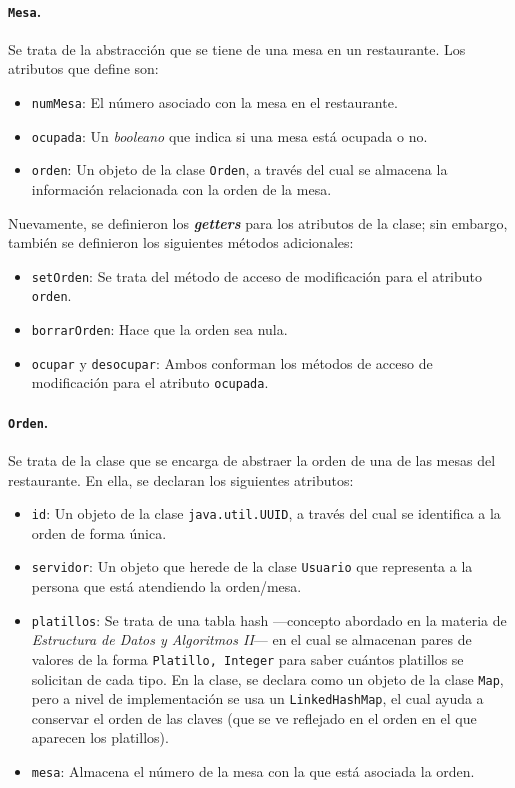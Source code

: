 \paragraph{\texttt{Mesa}.} Se trata de la abstracción que se tiene de una mesa en 
un restaurante. Los atributos que define son:
\begin{itemize}
  \item \texttt{numMesa}: El número asociado con la mesa en el restaurante.
  \item  \texttt{ocupada}: Un \textit{booleano} que indica si una mesa está ocupada
    o no.
  \item \texttt{orden}: Un objeto de la clase \texttt{Orden}, a través del cual se 
    almacena la información relacionada con la orden de la mesa.
\end{itemize}

Nuevamente, se definieron los \textit{\textbf{getters}} para los atributos de la 
clase; sin embargo, también se definieron los siguientes métodos adicionales:
\begin{itemize}
  \item \texttt{setOrden}: Se trata del método de acceso de modificación para el 
    atributo \texttt{orden}.
  \item \texttt{borrarOrden}: Hace que la orden sea nula.
  \item \texttt{ocupar} y \texttt{desocupar}: Ambos conforman los métodos de acceso 
    de modificación para el atributo \texttt{ocupada}.
\end{itemize}

\paragraph{\texttt{Orden}.} Se trata de la clase que se encarga de abstraer la orden 
de una de las mesas del restaurante. En ella, se declaran los siguientes atributos:
\begin{itemize}
  \item \texttt{id}: Un objeto de la clase \texttt{java.util.UUID}, a través del cual
    se identifica a la orden de forma única.
  \item \texttt{servidor}: Un objeto que herede de la clase \texttt{Usuario} que 
    representa a la persona que está atendiendo la orden/mesa.
  \item \texttt{platillos}: Se trata de una tabla hash ---concepto abordado en la materia
    de \textit{Estructura de Datos y Algoritmos II}--- en el cual se almacenan pares de 
    valores de la forma \texttt{Platillo, Integer} para saber cuántos platillos se 
    solicitan de cada tipo. En la clase, se declara como un objeto de la clase 
    \texttt{Map}, pero a nivel de implementación se usa un \texttt{LinkedHashMap}, el cual 
    ayuda a conservar el orden de las claves (que se ve reflejado en el orden en el que
    aparecen los platillos).
  \item \texttt{mesa}: Almacena el número de la mesa con la que está asociada la orden.
\end{itemize}

